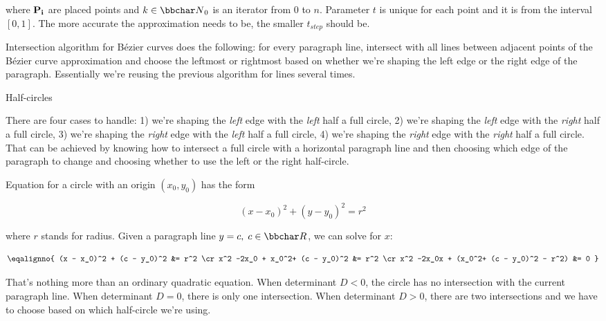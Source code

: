 where $\bf P_i$ are placed points and $k \in {\bbchar N}_0$ is an iterator from $0$ to $n$.
Parameter $t$ is unique for each point and it is from the interval $[0,1]$.
The more accurate the approximation needs to be, the smaller $t_{step}$ should be.

Intersection algorithm for Bézier curves does the following: for every paragraph
line, intersect with all lines between adjacent points of the Bézier curve approximation
and choose the leftmost or rightmost based on whether we're shaping the left edge or the
right edge of the paragraph. Essentially we're reusing the previous algorithm for lines
several times.

\curvetitle Half-circles

There are four cases to handle:
1) we're shaping the {\it left} edge with the {\it left} half a full circle,
2) we're shaping the {\it left} edge with the {\it right} half a full circle,
3) we're shaping the {\it right} edge with the {\it left} half a full circle,
4) we're shaping the {\it right} edge with the {\it right} half a full circle.
That can be achieved by knowing how to intersect a full circle with a horizontal
paragraph line and then choosing which edge of the paragraph to change and choosing
whether to use the left or the right half-circle.

Equation for a circle with an origin $(x_0, y_0)$ has the form

$$
(x - x_0)^2 + (y - y_0)^2 = r^2
$$

where $r$ stands for radius. Given a paragraph line $y = c,\;c\in{\bbchar R}$, we can solve
for $x$:

$$
\eqalignno{
(x - x_0)^2 + (c - y_0)^2 &= r^2 \cr
x^2 -2x_0 + x_0^2+ (c - y_0)^2 &= r^2 \cr
x^2 -2x_0x + (x_0^2+ (c - y_0)^2 - r^2) &= 0
}
$$

That's nothing more than an ordinary quadratic equation. When determinant $D < 0$,
the circle has no intersection with the current paragraph line. When determinant $D = 0$,
there is only one intersection. When determinant $D > 0$, there are two intersections
and we have to choose based on which half-circle we're using.

\bye
